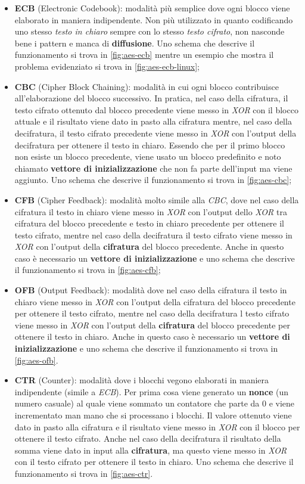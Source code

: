 \begin{itemize}
    \item \textbf{ECB} (Electronic Codebook): modalità più semplice dove ogni blocco viene elaborato in maniera indipendente. Non più utilizzato in quanto codificando uno stesso \emph{testo in chiaro} sempre con lo stesso \emph{testo cifrato}, non nasconde bene i pattern e manca di \textbf{diffusione}. Uno schema che descrive il funzionamento si trova in \autoref{fig:aes-ecb} mentre un esempio che mostra il problema evidenziato si trova in \autoref{fig:aes-ecb-linux};
    \item \textbf{CBC} (Cipher Block Chaining): modalità in cui ogni blocco contribuisce all'elaborazione del blocco successivo. In pratica, nel caso della cifratura, il testo cifrato ottenuto dal blocco precedente viene messo in \emph{XOR} con il blocco attuale e il risultato viene dato in pasto alla cifratura mentre, nel caso della decifratura, il testo cifrato precedente viene messo in \emph{XOR} con l'output della decifratura per ottenere il testo in chiaro. Essendo che per il primo blocco non esiste un blocco precedente, viene usato un blocco predefinito e noto chiamato \textbf{vettore di inizializzazione} che non fa parte dell'input ma viene aggiunto. Uno schema che descrive il funzionamento si trova in \autoref{fig:aes-cbc};
    \item \textbf{CFB} (Cipher Feedback): modalità molto simile alla \emph{CBC}, dove nel caso della cifratura il testo in chiaro viene messo in \emph{XOR} con l'output dello \emph{XOR} tra cifratura del blocco precedente e testo in chiaro precedente per ottenere il testo cifrato, mentre nel caso della decifratura il testo cifrato viene messo in \emph{XOR} con l'output della \textbf{cifratura} del blocco precedente. Anche in questo caso è necessario un \textbf{vettore di inizializzazione} e uno schema che descrive il funzionamento si trova in \autoref{fig:aes-cfb};
    \item \textbf{OFB} (Output Feedback): modalità dove nel caso della cifratura il testo in chiaro viene messo in \emph{XOR} con l'output della cifratura del blocco precedente per ottenere il testo cifrato, mentre nel caso della decifratura l testo cifrato viene messo in \emph{XOR} con l'output della \textbf{cifratura} del blocco precedente per ottenere il testo in chiaro. Anche in questo caso è necessario un \textbf{vettore di inizializzazione} e uno schema che descrive il funzionamento si trova in \autoref{fig:aes-ofb}.
    \item \textbf{CTR} (Counter): modalità dove i blocchi vegono elaborati in maniera indipendente (simile a \emph{ECB}). Per prima cosa viene generato un \textbf{nonce} (un numero casuale) al quale viene sommato un contatore che parte da 0 e viene incrementato man mano che si processano i blocchi. Il valore ottenuto viene dato in pasto alla cifratura e il risultato viene messo in \emph{XOR} con il blocco per ottenere il testo cifrato. Anche nel caso della decifratura il risultato della somma viene dato in input alla \textbf{cifratura}, ma questo viene messo in \emph{XOR} con il testo cifrato per ottenere il testo in chiaro. Uno schema che descrive il funzionamento si trova in \autoref{fig:aes-ctr}. \cite{wikipedia_aes_modes}

\end{itemize}
